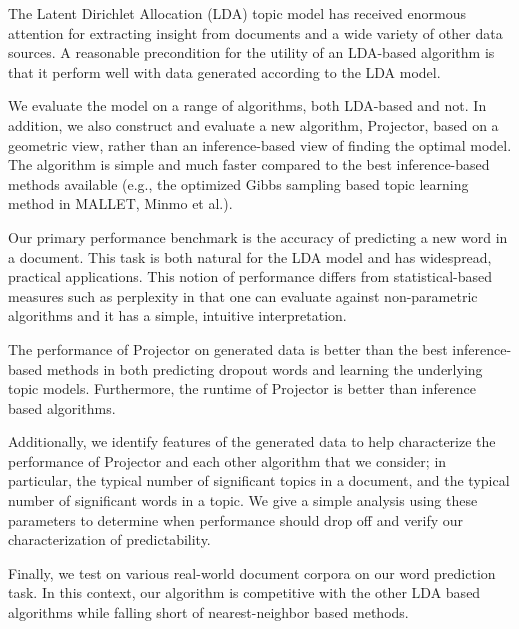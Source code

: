 The Latent Dirichlet Allocation (LDA) topic model has received
enormous attention for extracting insight from documents and a wide
variety of other data sources.  A reasonable precondition for the
utility of an LDA-based algorithm is that it perform well with data
generated according to the LDA model.

We evaluate the model on a range of algorithms, both LDA-based and
not. In addition, we also construct and evaluate a new algorithm,
Projector, based on a geometric view, rather than an inference-based
view of finding the optimal model. The algorithm is simple and much
faster compared to the best inference-based methods available (e.g.,
the optimized Gibbs sampling based topic learning method in MALLET,
Minmo et al.).

Our primary performance benchmark is  the accuracy of
predicting a new word in a document. This task is both natural for the
LDA model and has widespread, practical applications. This notion of
performance differs from statistical-based measures such as perplexity
in that one can evaluate against non-parametric algorithms and it
has a simple, intuitive interpretation.

The performance of Projector on generated data is better than the
best inference-based methods in both predicting dropout words and
learning the underlying topic models. Furthermore, the runtime
of Projector is better than inference based algorithms.

Additionally, we identify features of the generated data to help
characterize the performance of Projector and each other algorithm
that we consider; in particular, the typical number of significant
topics in a document, and the typical number of significant words in a
topic. We give a simple analysis using these parameters to determine
when performance should drop off and verify our characterization of
predictability.

Finally, we test on various real-world document corpora on our word
prediction task. In this context, our algorithm is competitive with
the other LDA based algorithms while falling short of nearest-neighbor
based methods.

